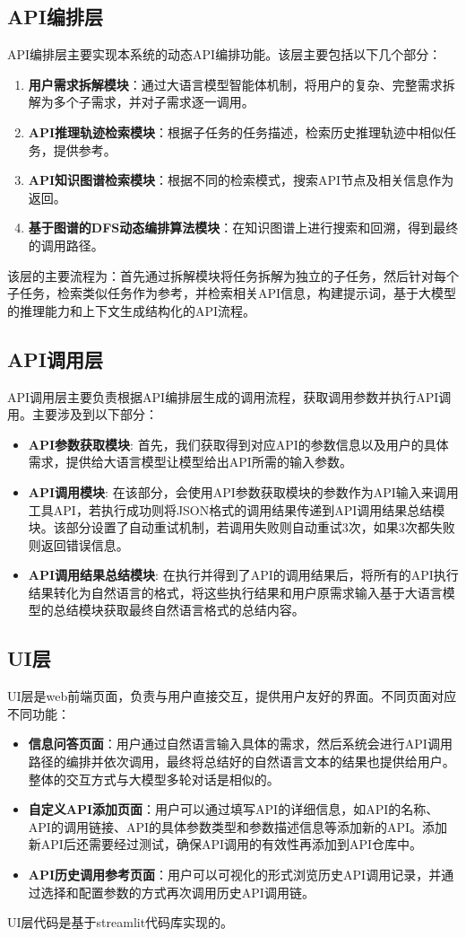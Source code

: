 \subsection{API编排层}
API编排层主要实现本系统的动态API编排功能。该层主要包括以下几个部分：
\begin{enumerate}
    \item \textbf{用户需求拆解模块}：通过大语言模型智能体机制，将用户的复杂、完整需求拆解为多个子需求，并对子需求逐一调用。
    \item \textbf{API推理轨迹检索模块}：根据子任务的任务描述，检索历史推理轨迹中相似任务，提供参考。
    \item \textbf{API知识图谱检索模块}：根据不同的检索模式，搜索API节点及相关信息作为返回。
    \item \textbf{基于图谱的DFS动态编排算法模块}：在知识图谱上进行搜索和回溯，得到最终的调用路径。
\end{enumerate}
该层的主要流程为：首先通过拆解模块将任务拆解为独立的子任务，然后针对每个子任务，检索类似任务作为参考，并检索相关API信息，构建提示词，基于大模型的推理能力和上下文生成结构化的API流程。

\subsection{API调用层}
API调用层主要负责根据API编排层生成的调用流程，获取调用参数并执行API调用。主要涉及到以下部分：
\begin{itemize}
    \item \textbf{API参数获取模块}: 首先，我们获取得到对应API的参数信息以及用户的具体需求，提供给大语言模型让模型给出API所需的输入参数。
    \item \textbf{API调用模块}: 在该部分，会使用API参数获取模块的参数作为API输入来调用工具API，若执行成功则将JSON格式的调用结果传递到API调用结果总结模块。该部分设置了自动重试机制，若调用失败则自动重试3次，如果3次都失败则返回错误信息。
    \item \textbf{API调用结果总结模块}: 在执行并得到了API的调用结果后，将所有的API执行结果转化为自然语言的格式，将这些执行结果和用户原需求输入基于大语言模型的总结模块获取最终自然语言格式的总结内容。
\end{itemize}

\subsection{UI层}
UI层是web前端页面，负责与用户直接交互，提供用户友好的界面。不同页面对应不同功能：
\begin{itemize}
    \item \textbf{信息问答页面}：用户通过自然语言输入具体的需求，然后系统会进行API调用路径的编排并依次调用，最终将总结好的自然语言文本的结果也提供给用户。整体的交互方式与大模型多轮对话是相似的。
    \item \textbf{自定义API添加页面}：用户可以通过填写API的详细信息，如API的名称、API的调用链接、API的具体参数类型和参数描述信息等添加新的API。添加新API后还需要经过测试，确保API调用的有效性再添加到API仓库中。
    \item \textbf{API历史调用参考页面}：用户可以可视化的形式浏览历史API调用记录，并通过选择和配置参数的方式再次调用历史API调用链。
\end{itemize}
UI层代码是基于streamlit代码库实现的。

